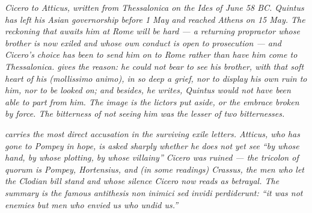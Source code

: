 
\textit{Cicero to Atticus, written from Thessalonica on the
Ides of June 58 BC. Quintus has left his Asian governorship
before 1 May and reached Athens on 15 May. The reckoning that
awaits him at Rome will be hard --- a returning propraetor
whose brother is now exiled and whose own conduct is open to
prosecution --- and Cicero's choice has been to send him on to
Rome rather than have him come to Thessalonica. 
gives the reason: he could not bear to see his brother, with
that soft heart of his (\textit{mollissimo animo}), in so deep
a grief, nor to display his own ruin to him, nor to be
looked on; and besides, he writes, Quintus would not have
been able to part from him. The image is the lictors put aside,
or the embrace broken by force. The bitterness of not seeing
him was the lesser of two bitternesses.}

\textit{ carries the most direct accusation in
the surviving exile letters. Atticus, who has gone to Pompey
in hope, is asked sharply whether he does not yet see ``by
whose hand, by whose plotting, by whose villainy'' Cicero was
ruined --- the tricolon of \textit{quorum} is Pompey,
Hortensius, and (in some readings) Crassus, the men who let
the Clodian bill stand and whose silence Cicero now reads as
betrayal. The summary is the famous antithesis \textit{non
inimici sed invidi perdiderunt}: ``it was not enemies but
men who envied us who undid us.''}
